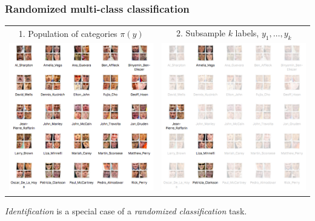\documentclass{beamer}
\begin{document}
\begin{frame}
\frametitle{Randomized multi-class classification}

\begin{center}
\begin{tabular}{c|c}
1. Population of categories $\pi(y)$ & 
2. Subsample $k$ labels, $y_1,\hdots, y_k$\\
\includegraphics[scale = 0.2]{photo_folders.png} &
\includegraphics[scale = 0.2]{photo_folders2.png}
\end{tabular}
\end{center}

\emph{Identification} is a special case of a \emph{randomized classification} task.

\end{frame}
\end{document}
